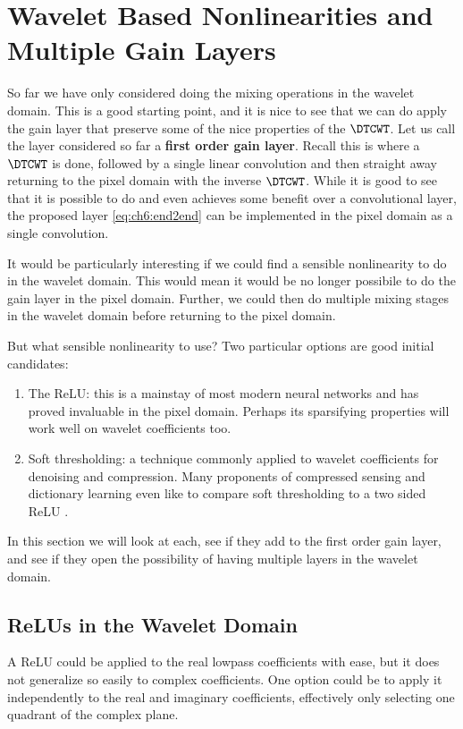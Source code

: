 \section{Wavelet Based Nonlinearities and Multiple Gain Layers}
So far we have only considered doing the mixing operations in the wavelet
domain. This is a good starting point, and it is nice to see that we can do
apply the gain layer that preserve some of the nice properties of the $\DTCWT$.
Let us call the layer considered so far a \textbf{first order gain layer}.
Recall this is where a $\DTCWT$ is done, followed by a single linear convolution
and then straight away returning to the pixel domain with the inverse $\DTCWT$.
While it is good to see that it is possible to do and even achieves some benefit
over a convolutional layer, the proposed layer \eqref{eq:ch6:end2end} can be
implemented in the pixel domain as a single convolution.

It would be particularly interesting if we could find a sensible nonlinearity to
do in the wavelet domain. This would mean it would be no longer possibile to do the
gain layer in the pixel domain. Further, we could then do multiple mixing
stages in the wavelet domain before returning to the pixel domain.

But what sensible nonlinearity to use? Two particular options are good initial
candidates:
\begin{enumerate}
  \item The ReLU: this is a mainstay of most modern neural networks and has
    proved invaluable in the pixel domain. Perhaps its sparsifying properties
    will work well on wavelet coefficients too. 
  \item Soft thresholding: a technique commonly applied to wavelet
    coefficients for denoising and compression. Many proponents of compressed
    sensing and dictionary learning even like to compare soft thresholding to a
    two sided ReLU \cite{papyan_theoretical_2018, papyan_convolutional_2016}.
\end{enumerate}

In this section we will look at each, see if they add to the first order gain
layer, and see if they open the possibility of having multiple layers in the
wavelet domain. 

\subsection{ReLUs in the Wavelet Domain}
A ReLU could be applied to the real lowpass coefficients with ease, but it does
not generalize so easily to complex coefficients. One option could be to apply
it independently to the real and imaginary coefficients, effectively only
selecting one quadrant of the complex plane.

